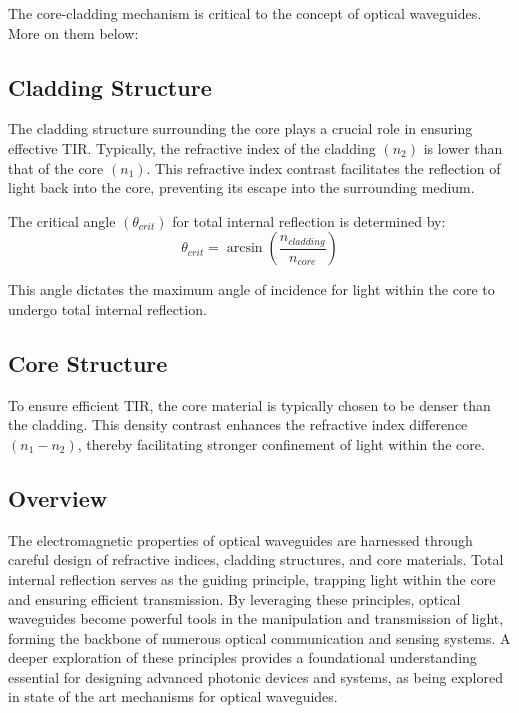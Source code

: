 \documentclass[10pt]{article}
\begin{document}
The core-cladding mechanism is critical to the concept of optical waveguides. More on them below:

\subsection{Cladding Structure}

The cladding structure surrounding the core plays a crucial role in ensuring effective TIR. Typically, the refractive index of the cladding
$(n_2)$ is lower than that of the core $(n_1)$. This refractive index contrast facilitates the reflection of light back into the core, preventing its escape into the surrounding medium.

The critical angle $(\theta_{crit})$ for total internal reflection is determined by:
\begin{equation}
    \theta_{crit} = \arcsin(\frac{n_{cladding}}{n_{core}})
\end{equation}

This angle dictates the maximum angle of incidence for light within the core to undergo total internal reflection.

\subsection{Core Structure}
To ensure efficient TIR, the core material is typically chosen to be denser than the cladding. This density contrast enhances the refractive index difference $(n_1 - n_2)$,
thereby facilitating stronger confinement of light within the core.

\subsection{Overview}
The electromagnetic properties of optical waveguides are harnessed through careful design of refractive indices, cladding structures, and core materials. 
Total internal reflection serves as the guiding principle, trapping light within the core and ensuring efficient transmission. 
By leveraging these principles, optical waveguides become powerful tools in the manipulation and transmission of light, 
forming the backbone of numerous optical communication and sensing systems. A deeper exploration of these principles provides a foundational understanding essential for designing advanced photonic 
devices and systems, as being explored in state of the art mechanisms for optical waveguides.

\end{document}
